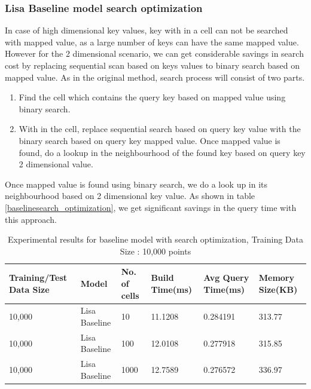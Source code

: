 \subsubsection {Lisa Baseline model search optimization}
In case of high dimensional key values, key with in a cell can not be searched with mapped value, as a large number of keys can have the same mapped value. However for the 2 dimensional scenario, we can get considerable savings in search cost by replacing sequential scan based on keys values to binary search based on mapped value. As in the original method, search process  will consist of two parts. 
\begin{enumerate}
	\item Find the cell which contains the query key based on mapped value using binary search. 
	\item With in the cell, replace sequential search based on query key value with the  binary search based on query key mapped value. Once mapped value is found, do a lookup in the neighbourhood of the found key based on query key 2 dimensional value. 
\end{enumerate}
Once mapped value is found using binary search, we do a look up in its neighbourhood based on 2 dimensional key value. As shown in table \ref{baselinesearch_optimization}, we get significant savings in the query time with this approach.

\begin{table}[ht]
	\centering
	\begin{tabular}{||p{}<{\centering}|p{}<{\centering}| p{}<{\centering}|p{}<{\centering}|p{}<{\centering}|p{}<{\centering}||}
		\hline
		Training/Test Data Size& Model & No. of cells & Build Time(ms) & Avg Query Time(ms) & Memory Size(KB)\\ [0.5ex] 
		\hline
		\hline
		10,000& Lisa Baseline & 10 & 11.1208 & 0.284191 & 313.77\\
		\hline
		10,000& Lisa Baseline & 100 & 12.0108 & 0.277918 & 315.85\\
		\hline
		10,000& Lisa Baseline & 1000 & 12.7589 & 0.276572 & 336.97\\
		\hline
		\hline
	\end{tabular}
	\caption{Experimental results for baseline model with search optimization, Training Data Size : 10,000 points}
	\label{baseline_search_optimization_10000}

\end{table}

